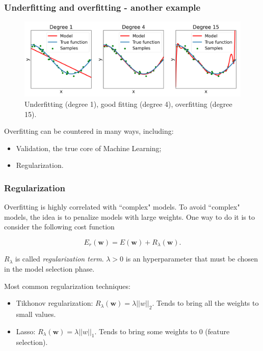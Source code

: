 \documentclass{beamer}
\begin{document}
	\begin{frame}
		\frametitle{Underfitting and overfitting - another example}
		\begin{figure}
			\centering
			\includegraphics[scale=0.35]{images/overfitting_poly}
			\caption{Underfitting (degree 1), good fitting (degree 4), overfitting (degree 15).}
		\end{figure}
	
	Overfitting can be countered in many ways, including:
	
	\begin{itemize}
		\item Validation, the true core of Machine Learning;
		\item Regularization.
	\end{itemize}
	\end{frame}


	\begin{frame}
		\frametitle{Regularization}
		
		Overfitting is highly correlated with ``complex" models. To avoid ``complex" models, the idea is to penalize models with large weights. One way to do it is to consider the following cost function
		
	\vspace{5mm}
	
		\begin{equation*}
			E_{r}(\bm{w}) = E(\bm{w}) + R_{\lambda}(\bm{w}).
		\end{equation*}
		
	\vspace{5mm}
	
	$R_{\lambda}$ is called \textsl{regularization term}.
	$\lambda > 0$ is an hyperparameter that must be chosen in the model selection phase.
	
	Most common regularization techniques:
	\begin{itemize}
		\item Tikhonov regularization: $R_{\lambda}(\bm{w}) = \lambda ||w||_2$. Tends to bring all the weights to small values.
		\item Lasso: $R_{\lambda}(\bm{w}) = \lambda ||w||_1$. Tends to bring some weights to $0$ (feature selection).
	\end{itemize}
	\end{frame}
\end{document}
